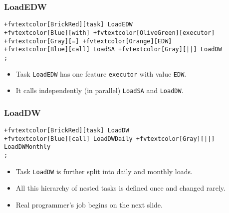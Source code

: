\documentclass[english,xcolor={dvipsnames}]{beamer}
\begin{document}
\begin{frame}[fragile]
\frametitle{LoadEDW}
\begin{Verbatim}[commandchars=+\[\]]
+fvtextcolor[BrickRed][task] LoadEDW
+fvtextcolor[Blue][with] +fvtextcolor[OliveGreen][executor] +fvtextcolor[Gray][=] +fvtextcolor[Orange][EDW]
+fvtextcolor[Blue][call] LoadSA +fvtextcolor[Gray][||] LoadDW
;
\end{Verbatim}
\begin{itemize}
    \item Task \verb|LoadEDW| has one feature \verb|executor| with value \verb|EDW|.
    \item It calls independently (in parallel) \verb|LoadSA| and \verb|LoadDW|.
\end{itemize}
\end{frame}

\begin{frame}[fragile]
\frametitle{LoadDW}
\begin{Verbatim}[commandchars=+\[\]]
+fvtextcolor[BrickRed][task] LoadDW
+fvtextcolor[Blue][call] LoadDWDaily +fvtextcolor[Gray][||] LoadDWMonthly
;
\end{Verbatim}
\begin{itemize}
    \item Task \verb|LoadDW| is further split into daily and monthly loads.
    \item All this hierarchy of nested tasks is defined once and changed rarely.
    \item Real programmer's job begins on the next slide.
\end{itemize}
\end{frame}
\end{document}
